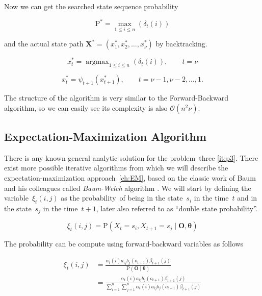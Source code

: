 \documentclass[thesis=M,english]{FITthesis}[2012/10/20]
\newcommand{\matr}[1]{\mathbf{#1}}
\newcommand{\argmax}{\mathop{\mathrm{argmax}}}
\begin{document}
Now we can get the searched state sequence probability 

\begin{equation}
\mathrm{P}^* = \max_{1 \leq i \leq n} ( \delta_{t}(i) )  
\end{equation}

and the actual state path $\matr{X}^* = ( x_1^*, x_2^*, \dots, x_{\nu}^*)$ by backtracking.

\begin{equation}
x_t^* = \argmax_{1 \leq i \leq n} ( \delta_{t}(i) ),  \qquad t = \nu 
\end{equation}

\begin{equation}
x_t^* = \psi_{t+1}(x_{t+1}^*), \qquad t = \nu-1, \nu-2, \dots, 1.  
\end{equation}

The structure of the algorithm is very similar to the Forward-Backward algorithm, so we can easily see its complexity is also $\mathcal{O}(n^2\nu)$.

\subsection{Expectation-Maximization Algorithm}\label{sec:BWA}

There is any known general analytic solution for the problem~three \ref{it:p3}. There exist more possible iterative algorithms from which we will describe the expectation-maximization approach~\ref{ch:EM}, based on the classic work of Baum and his colleagues called \textit{Baum-Welch} algorithm \cite{Ba70}. We will start by defining the variable~$\xi_t(i,j)$ as the probability~of being in the state~$s_i$ in the time~$t$ and in the state~$s_j$ in the time~$t+1$, later also referred to as ``double state probability''. 

\begin{equation}
\xi_t(i,j) = \mathrm{P}( X_t = s_i, X_{t+1} = s_j \mid \matr{O}, \matr{\theta} )  
\end{equation}

The probability can be compute using forward-backward variables as follows
 
\begin{equation}\label{eq:xi}
\begin{aligned}
\xi_t(i,j) &= \frac{ \alpha_t(i) a_{ij} b_j(o_{t+1}) \beta_{t+1}(j) }
		   		   { \mathrm{P}( \matr{O} \mid \matr{\theta} ) } \\
		   &= \frac{ \alpha_t(i) a_{ij} b_j(o_{t+1}) \beta_{t+1}(j) }
		   		   { \sum\limits_{i=1}^n \sum\limits_{j=1}^n \alpha_t(i) a_{ij} b_j(o_{t+1}) \beta_{t+1}(j) }
\end{aligned}
\end{equation}
\end{document}
